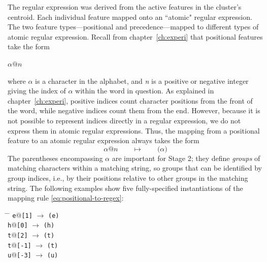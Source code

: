{The regular expression was derived from the active 
features in the cluster's centroid. Each individual feature mapped onto an ``atomic" regular expression.
The two feature types---positional and precedence---mapped to different types of
atomic regular expression. 
Recall from chapter~\ref{ch:experi} that positional features take 
the form
\begin{centering}
$\alpha\text{@}n$
\end{centering}
where $\alpha$ is a character in the alphabet, and \textit{n} is a positive or negative integer 
giving the index of $\alpha$ within the word in question. As explained in chapter~\ref{ch:experi}, 
positive indices count character positions from the front of the word, while negative indices 
count them from the end. However, because it is not possible to represent indices directly in a regular
expression, we do not express them in atomic regular 
expressions. %
Thus, the mapping from a positional feature to an atomic regular expression always takes the form 
\begin{equation} \label{eq:positional-to-regex}
\alpha\text{@}n \qquad \mapsto \qquad \texttt{(}\alpha\texttt{)}
\end{equation}
The parentheses encompassing $\alpha$ are important for Stage 2; they define 
\emph{groups} of matching characters within a matching
string, so groups that can be identified by group indices, i.e., by their positions relative to other groups
in the matching string.
The following examples show five fully-specified instantiations of the mapping rule \eqref{eq:positional-to-regex}:
\begin{exe}
\ex \label{ex:positional-morphs}
\begin{xlist}
\begin{tabbing}
\hspace{0.7in} \= \hspace{0.5in} \=  \hspace{4.5in} \kill
 \texttt{e}\textrm{@}\texttt{[1]} \> $\to$ \>   \texttt{(e)} \\
 \texttt{h}\textrm{@}\texttt{[0]}  \>$\to$ \>     \texttt{(h)} \\
 \texttt{t}\textrm{@}\texttt{[2]}  \> $\to$   \>       \texttt{(t)} \\
 \texttt{t}@\texttt{[-1]}  \>  $\to$   \>    \texttt{(t)} \\
 \texttt{u}\textrm{@}\texttt{[-3]} \>   $\to$   \>   \texttt{(u)} \\
\end{tabbing}
\end{xlist}
\end{exe}

}
